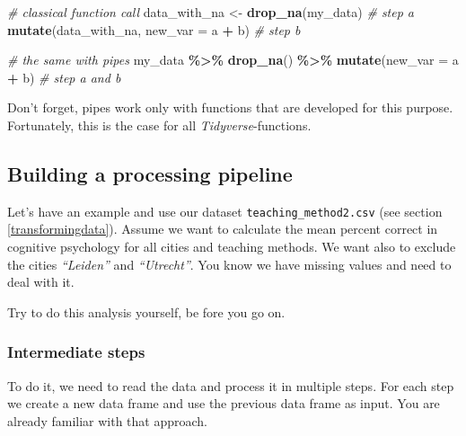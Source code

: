 \documentclass[
]{scrartcl}
\makeatletter
\newenvironment{Shaded}{\begin{snugshade}}{\end{snugshade}}
\newcommand{\AttributeTok}[1]{\textcolor[rgb]{0.13,0.29,0.53}{#1}}
\newcommand{\CommentTok}[1]{\textcolor[rgb]{0.56,0.35,0.01}{\textit{#1}}}
\newcommand{\FunctionTok}[1]{\textcolor[rgb]{0.13,0.29,0.53}{\textbf{#1}}}
\newcommand{\NormalTok}[1]{#1}
\newcommand{\OtherTok}[1]{\textcolor[rgb]{0.56,0.35,0.01}{#1}}
\newcommand{\SpecialCharTok}[1]{\textcolor[rgb]{0.81,0.36,0.00}{\textbf{#1}}}
\newenvironment{kframe}{%
\medskip{}
\setlength{\fboxsep}{.8em}
 \def\at@end@of@kframe{}%
 \ifinner\ifhmode%
  \def\at@end@of@kframe{\end{minipage}}%
  \begin{minipage}{\columnwidth}%
 \fi\fi%
 \def\FrameCommand##1{\hskip\@totalleftmargin \hskip-\fboxsep
 \colorbox{shadecolor}{##1}\hskip-\fboxsep
     \hskip-\linewidth \hskip-\@totalleftmargin \hskip\columnwidth}%
 \MakeFramed {\advance\hsize-\width
   \@totalleftmargin\z@ \linewidth\hsize
   \@setminipage}}%
 {\par\unskip\endMakeFramed%
 \at@end@of@kframe}
\newenvironment{rmdblock}[1]
  {
  \begin{itemize}
  \renewcommand{\labelitemi}{
    \raisebox{-.7\height}[0pt][0pt]{
      {\setkeys{Gin}{width=3em,keepaspectratio}\texttt{[image: images/\#1]}}
    }
  }
  \setlength{\fboxsep}{1em}
  \begin{kframe}
  \item
  }
  {
  \end{kframe}
  \end{itemize}
  }
\newenvironment{important}
    {\begin{rmdblock}{hint}}
    {\end{rmdblock}}
\newenvironment{myexercise}
    {\begin{rmdblock}{exercise_green}}
    {\end{rmdblock}}
\makeatother
\begin{document}
\begin{Shaded}
\begin{Highlighting}[]
\CommentTok{\# classical function call}
\NormalTok{data\_with\_na }\OtherTok{\textless{}{-}} \FunctionTok{drop\_na}\NormalTok{(my\_data)                }\CommentTok{\# step a}
\FunctionTok{mutate}\NormalTok{(data\_with\_na, }\AttributeTok{new\_var =}\NormalTok{ a }\SpecialCharTok{+}\NormalTok{ b) }\CommentTok{\# step b}

\CommentTok{\# the same with pipes}
\NormalTok{my\_data }\SpecialCharTok{\%\textgreater{}\%} \FunctionTok{drop\_na}\NormalTok{() }\SpecialCharTok{\%\textgreater{}\%} \FunctionTok{mutate}\NormalTok{(}\AttributeTok{new\_var =}\NormalTok{ a }\SpecialCharTok{+}\NormalTok{ b)  }\CommentTok{\# step a and b}
\end{Highlighting}
\end{Shaded}

\begin{important}
 Don't forget, pipes work only with functions that are developed for this
 purpose. Fortunately, this is the case for all
 \emph{Tidyverse}-functions.
 \end{important}

\subsection{Building a processing pipeline}\label{building-a-processing-pipeline}

Let's have an example and use our dataset \texttt{teaching\_method2.csv} (see section \ref{transformingdata}). Assume we want to calculate the mean percent correct in cognitive psychology for all cities and teaching methods. We want also to exclude the cities \emph{``Leiden''} and \emph{``Utrecht''}. You know we have missing values and need to deal with it.

\begin{myexercise}
Try to do this analysis yourself, be fore you go on.
\end{myexercise}

\subsubsection{Intermediate steps}\label{intermediatesteps}

To do it, we need to read the data and process it in multiple steps. For each step we create a new data frame and use the previous data frame as input. You are already familiar with that approach.
\end{document}
